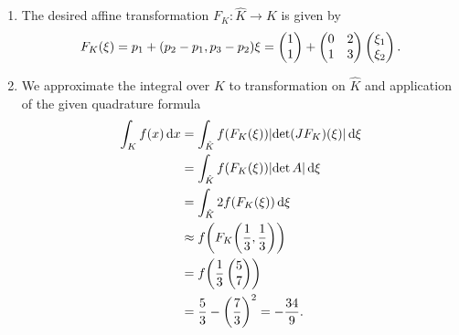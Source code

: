 \documentclass[english]{exercise}
\begin{document}
    \begin{enumerate}
        \item The desired affine transformation \(F_K: \hat{K} \to K\) is given by
        \[
            F_K\parentheses*{\xi} = p_1 + \parentheses*{p_2 - p_1, p_3 - p_2}\xi = \begin{pmatrix}
                1\\
                1
            \end{pmatrix} + \begin{pmatrix}
                0 & 2\\
                1 & 3
            \end{pmatrix}\begin{pmatrix}
                \xi_1\\
                \xi_2
            \end{pmatrix}.
        \]
        \item We approximate the integral over \(K\) to transformation on \(\hat{K}\) and application of the given quadrature formula
        \begin{align*}
            \int_K f\parentheses*{x}\d x &= \int_{\hat{K}}f\parentheses*{F_K\parentheses*{\xi}}\absolute*{\det\parentheses*{JF_K}\parentheses*{\xi}}\d\xi\\
            &= \int_{\hat{K}}f\parentheses*{F_K\parentheses*{\xi}}\absolute*{\det A}\d\xi\\
            &= \int_{\hat{K}}2f\parentheses*{F_K\parentheses*{\xi}}\d\xi\\
            &\approx f\parentheses*{F_K\parentheses*{\frac{1}{3}, \frac{1}{3}}}\\
            &= f\parentheses*{\frac{1}{3}\begin{pmatrix}
                5\\
                7
            \end{pmatrix}}\\
            &= \frac{5}{3} - \parentheses*{\frac{7}{3}}^2 = -\frac{34}{9}.
        \end{align*}
    \end{enumerate}
    
    
    \section{}
    
\end{document}

